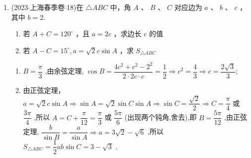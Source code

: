 \begin{enumerate}
    \item (2023$\cdot$上海春季卷$\cdot$18)在 $\bigtriangleup  {ABC}$ 中，角 $A$ 、 $B$ 、 $C$ 对应边为 $a$ 、 $b$ 、 $c$ ，其中 $b = 2$.
    \begin{enumerate}
        \item 若 $A + C = {120}^{ \circ  }$ ，且 $a = {2c}$ ，求边长 $c$ 的值
        \item 若 ${A - C} = {15}^{ \circ  },{a = \sqrt{2}c\sin A}$ ，求 ${S}_{\bigtriangleup {ABC}}$
    \end{enumerate}
    \begin{jieda}
        \begin{enumerate}
            \item $B = \dfrac{\pi }{3}$ ,由余弦定理, $\cos B = \dfrac{4{c}^{2} + {c}^{2} - {2}^{2}}{2 \cdot  {2c} \cdot  c} = \dfrac{1}{2} \Longrightarrow  {c}^{2} = \dfrac{4}{3} \Longrightarrow  c = \dfrac{2\sqrt{3}}{3};$
            \item 由正弦定理， $a = \sqrt{2}c\sin A \Longrightarrow  \sin A = \sqrt{2}\sin C\sin A \Longrightarrow  \sin C =  \dfrac{\sqrt{2}}{2} \Longrightarrow  C = \dfrac{\pi }{4}$ 或 $\dfrac{3\pi }{4}$ ,所以 $A = C + \dfrac{\pi }{12} = \dfrac{\pi }{3}$ 或 $\dfrac{5\pi }{6}$ (出现两个钝角,舍去),即 $B = \dfrac{5\pi }{12}$ ,由正弦定理, $\dfrac{b}{\sin B} = \dfrac{a}{\sin A} \Longrightarrow  a = 3\sqrt{2} -  \sqrt{6}$ ,所以 ${S}_{\bigtriangleup {ABC}} = \dfrac{1}{2}{ab}\sin C = 3 - \sqrt{3}$ .
        \end{enumerate}
    \end{jieda}


\end{enumerate}
